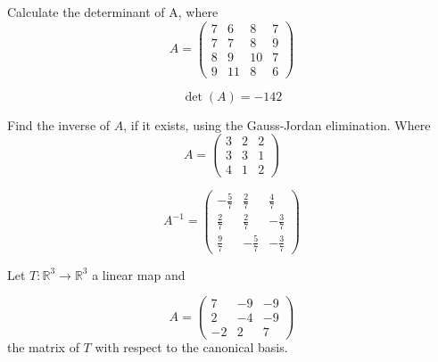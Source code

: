 \begin{questions}

\question Calculate the determinant of A, where
$$
A=\left(\begin{array}{rrrr}
7 & 6 & 8 & 7 \\
7 & 7 & 8 & 9 \\
8 & 9 & 10 & 7 \\
9 & 11 & 8 & 6
\end{array}\right)
$$

\begin{solution}
$$\det(A)=-142$$
\end{solution}

\question Find the inverse of $A$, if it exists, using the Gauss-Jordan elimination. Where
$$
A=\left(\begin{array}{rrr}
3 & 2 & 2 \\
3 & 3 & 1 \\
4 & 1 & 2
\end{array}\right)
$$

\begin{solution}
$$A^{-1}=\left(\begin{array}{rrr}
-\frac{5}{7} & \frac{2}{7} & \frac{4}{7} \\
\frac{2}{7} & \frac{2}{7} & -\frac{3}{7} \\
\frac{9}{7} & -\frac{5}{7} & -\frac{3}{7}
\end{array}\right)$$
\end{solution}

\question Let $T:\mathbb{R}^3\rightarrow\mathbb{R}^3$  a linear map and
 
$$
A=\left(\begin{array}{rrr}
7 & -9 & -9 \\
2 & -4 & -9 \\
-2 & 2 & 7
\end{array}\right)
$$
the matrix of $T$ with respect to the canonical basis.
\end{questions}
